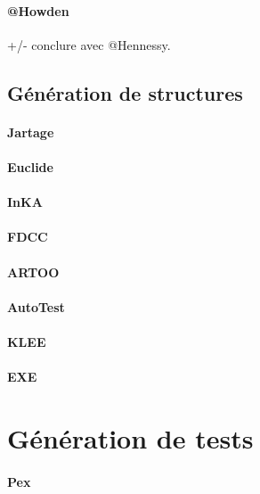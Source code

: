 \paragraph{@Howden}

+/- conclure avec @Hennessy.

\subsection{Génération de structures}

\paragraph{Jartage}

\paragraph{Euclide}

\paragraph{InKA}

\paragraph{FDCC}

\paragraph{ARTOO}

\paragraph{AutoTest}

\paragraph{KLEE}

\paragraph{EXE}

\section{Génération de tests}

\paragraph{Pex}

